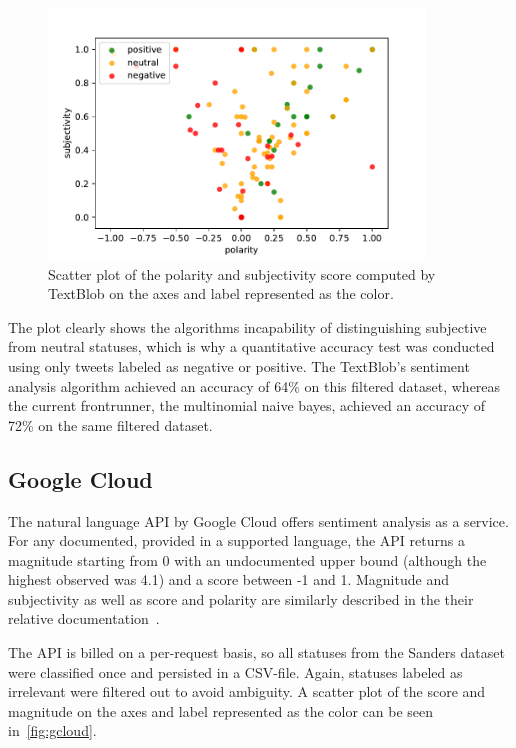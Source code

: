 \begin{figure}
    \centering
    \caption{Scatter plot of the polarity and subjectivity score computed by TextBlob on the axes and label represented as the color.}
    \label{fig:textblob}
    \includegraphics[width=10cm]{../figures/textblob.pdf}
\end{figure}

The plot clearly shows the algorithms incapability of distinguishing subjective from neutral statuses,
which is why a quantitative accuracy test was conducted using only tweets labeled as negative or positive.
The TextBlob's sentiment analysis algorithm achieved an accuracy of 64\% on this filtered dataset,
whereas the current frontrunner, the multinomial naive bayes, achieved an accuracy of 72\% on the same filtered dataset.

\subsection{Google Cloud}
\label{subsec:googlecloud} %

The natural language API by Google Cloud offers sentiment analysis as a service.
For any documented, provided in a supported language, the API returns a magnitude starting from 0 with an undocumented upper bound
(although the highest observed was 4.1) and a score between -1 and 1.
Magnitude and subjectivity as well as score and polarity are similarly described in the their relative documentation~\cite{gcloudDocs}\cite{textblobDocs}.
\par
The API is billed on a per-request basis, so all statuses from the Sanders dataset were classified once and persisted in a CSV-file.
Again, statuses labeled as irrelevant were filtered out to avoid ambiguity.
A scatter plot of the score and magnitude on the axes and label represented as the color can be seen in~\ref{fig:gcloud}.

